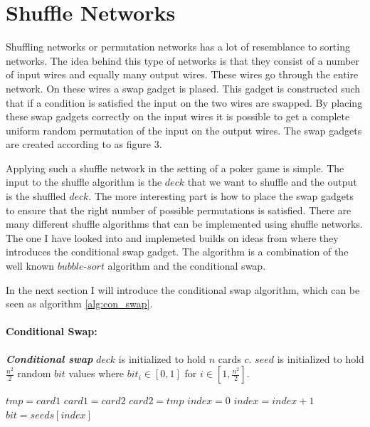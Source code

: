\documentclass[twoside,11pt,openright]{report}
\begin{document}
\section{Shuffle Networks}
Shuffling networks or permutation networks has a lot of resemblance to sorting networks. The idea behind this type of networks is that they consist of a number of input wires and equally many output wires. These wires go through the entire network. On these wires a swap gadget is plased. This gadget is constructed such that if a condition is satisfied the input on the two wires are swapped. By placing these swap gadgets correctly on the input wires it is possible to get a complete uniform random permutation of the input on the output wires. The swap gadgets are created according to \cite{psi} as figure 3.

Applying such a shuffle network in the setting of a poker game is simple. The input to the shuffle algorithm is the $deck$ that we want to shuffle and the output is the shuffled $deck$. The more interesting part is how to place the swap gadgets to ensure that the right number of possible permutations is satisfied. There are many different shuffle algorithms that can be implemented using shuffle networks. The one I have looked into and implemeted builds on ideas from \cite{psi} where they introduces the conditional swap gadget. The algorithm is a combination of the well known $bubble\text{-}sort$ algorithm and the conditional swap.

\bigskip

In the next section I will introduce the conditional swap algorithm, which can be seen as algorithm \ref{alg:con_swap}.

\bigskip

\paragraph{Conditional Swap:}
\label{sec:con_swap}

\begin{algorithm}
\caption{\textbf{\textit{Conditional swap}} \newline
    $deck$ is initialized to hold $n$ cards $c$. \newline
    $seed$ is initialized to hold $\frac{n^2}{2}$ random $bit$ values where $bit_i\in[0,1]$ for $i\in [1,\frac{n^2}{2}]$.
}
\label{alg:con_swap}

\begin{algorithmic}[1]
\State $tmp = card1$
\State $card1 = card2$
\State $card2 = tmp$
\EndIf
\EndFunction
\State
{}
\State $index = 0$
\State $index = index + 1$
\State $bit = seeds[index]$
\State {}
\EndFor
\EndFor
\EndFunction
\end{algorithmic}
\end{algorithm}
\end{document}
